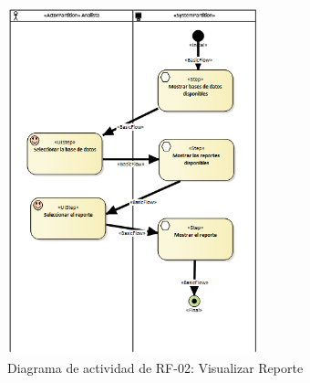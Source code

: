 \begin{figure}[H]
    \centering
    \includegraphics[width=0.65\textwidth]{figures/FR02.png}
    \caption{Diagrama de actividad de RF-02: Visualizar Reporte}
    \label{fig:FR02}
\end{figure}

